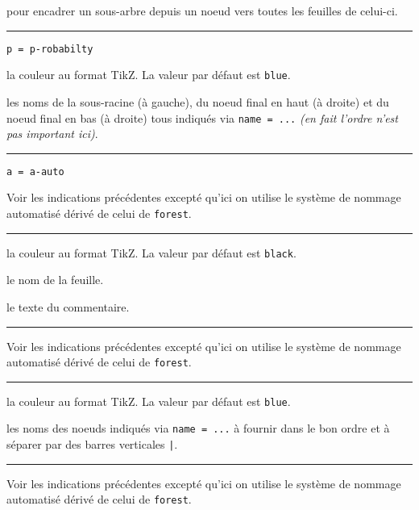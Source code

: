 \documentclass[12pt,a4paper]{article}
\theoremstyle{definition}
\newcommand\separation{
	\medskip
	\hfill\rule{0.5\textwidth}{0.75pt}\hfill
	\medskip
}
\newcommand\extraspace{
	\vspace{0.25em}
}
\newcommand\mwhyprefix[2]{%
	\texttt{#1 = #1-#2}%
}
\begin{document}
\extraspace

 pour encadrer un sous-arbre depuis un noeud vers toutes les feuilles de celui-ci.


\separation


 \hfill \mwhyprefix{p}{robabilty}

\IDoption{} la couleur au format TikZ. La valeur par défaut est \verb#blue#.

 les noms de la sous-racine (à gauche), du noeud final en haut (à droite) et du noeud final en bas (à droite) tous indiqués via \verb#name = ...# \emph{(en fait l'ordre n'est pas important ici)}.


\separation


 \hfill \mwhyprefix{a}{auto}

\extraspace
\extraspace

Voir les indications précédentes excepté qu'ici on utilise le système de nommage automatisé dérivé de celui de \verb#forest#.


\separation



\IDoption{} la couleur au format TikZ. La valeur par défaut est \verb#black#.

 le nom de la feuille.

 le texte du commentaire.


\separation



\extraspace
\extraspace

Voir les indications précédentes excepté qu'ici on utilise le système de nommage automatisé dérivé de celui de \verb#forest#.


\separation





\IDoption{} la couleur au format TikZ. La valeur par défaut est \verb#blue#.

\IDarg{} les noms des noeuds indiqués via \verb#name = ...# à fournir dans le bon ordre et à séparer par des barres verticales \verb#|#.


\separation





\extraspace
\extraspace

Voir les indications précédentes excepté qu'ici on utilise le système de nommage automatisé dérivé de celui de \verb#forest#.
\end{document}
